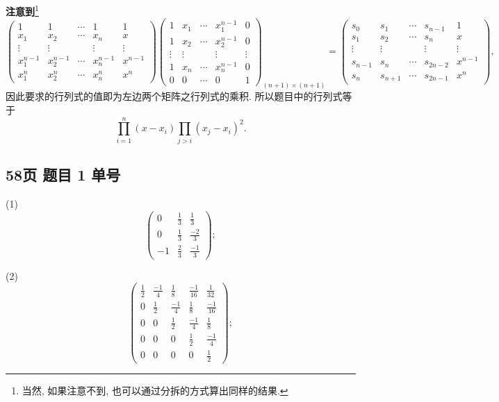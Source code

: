 \begin{solution}\par
\textbf{注意到}\footnote{当然, 如果注意不到, 也可以通过分拆的方式算出同样的结果.}
\[
\begin{pmatrix}
    1 & 1 & \cdots & 1 & 1 \\
    x_1 & x_2 & \cdots & x_n & x \\
    \vdots & \vdots &  & \vdots & \vdots \\
    x_1^{n - 1} & x_2^{n - 1} & \cdots & x_n^{n - 1} & x^{n - 1} \\
    x_1^{n} & x_2^{n} & \cdots & x_n^n & x^n
\end{pmatrix}
\begin{pmatrix}
    1 & x_1 & \cdots & x_1^{n - 1} & 0 \\
    1 & x_2 & \cdots & x_2^{n - 1} & 0 \\
    \vdots & \vdots &  & \vdots & \vdots \\
    1 & x_n & \cdots & x_n^{n - 1} & 0 \\
    0 & 0 & \cdots & 0 & 1
\end{pmatrix}_{(n + 1) \times (n + 1)}
=
\begin{pmatrix}
    s_0 & s_1 & \cdots & s_{n - 1} & 1 \\
    s_1 & s_2 & \cdots & s_{n}     & x \\
    \vdots & \vdots &  & \vdots & \vdots \\
    s_{n - 1} & s_n & \cdots & s_{2n - 2} & x^{n - 1} \\
    s_{n} & s_{n + 1} & \cdots & s_{2n - 1} & x^{n}
\end{pmatrix},
\]
因此要求的行列式的值即为左边两个矩阵之行列式的乘积. 所以题目中的行列式等于
\[
\prod_{i = 1}^{n}(x - x_i) \prod_{j > i} (x_j - x_i)^2.
\]

\newpage
\subsection*{58页 题目 1 单号}
(1)
\[
\left(\begin{matrix}
    0 & \frac{1}{3} & \frac{1}{3} \\
    0 & \frac{1}{3} & \frac{-2}{3} \\
    -1 & \frac{2}{3} & \frac{-1}{3}
\end{matrix}\right);
\]

(2)
\[
\left(\begin{matrix}
    \frac{1}{2} & \frac{-1}{4} & \frac{1}{8} & \frac{-1}{16} & \frac{1}{32} \\
    0 & \frac{1}{2} & \frac{-1}{4} & \frac{1}{8} & \frac{-1}{16} \\
    0 & 0 & \frac{1}{2} & \frac{-1}{4} & \frac{1}{8} \\
    0 & 0 & 0 & \frac{1}{2} & \frac{-1}{4} \\
    0 & 0 & 0 & 0 & \frac{1}{2}
\end{matrix}\right);
\]


\end{solution}
